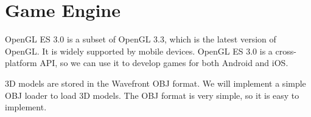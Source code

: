 \documentclass[a4paper]{article}
\begin{document}
\hypertarget{game-engine}{%
\section{Game Engine}\label{game-engine}}

OpenGL ES 3.0 is a subset of OpenGL 3.3, which is the latest version of
OpenGL. It is widely supported by mobile devices. OpenGL ES 3.0 is a
cross-platform API, so we can use it to develop games for both Android
and iOS.

3D models are stored in the Wavefront OBJ format. We will implement a
simple OBJ loader to load 3D models. The OBJ format is very simple, so
it is easy to implement.
\end{document}

